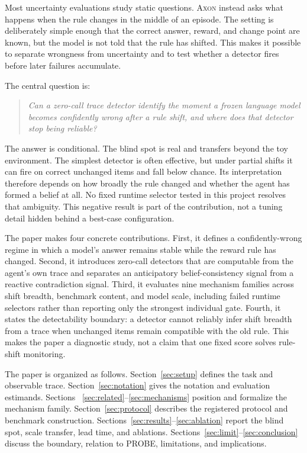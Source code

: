 \documentclass[pdflatex,sn-basic]{sn-jnl}
\theoremstyle{definition}
\newcommand{\axon}{\textsc{Axon}}
\begin{document}
Most uncertainty evaluations study static questions. \axon{} instead asks what happens when
the rule changes in the middle of an episode. The setting is deliberately simple enough that
the correct answer, reward, and change point are known, but the model is not told that the rule
has shifted. This makes it possible to separate wrongness from uncertainty and to test whether
a detector fires before later failures accumulate.

The central question is:
\begin{quote}
\emph{Can a zero-call trace detector identify the moment a frozen language model becomes
confidently wrong after a rule shift, and where does that detector stop being reliable?}
\end{quote}

The answer is conditional. The blind spot is real and transfers beyond the toy environment.
The simplest detector is often effective, but under partial shifts it can fire on correct
unchanged items and fall below chance. Its interpretation therefore depends on how broadly
the rule changed and whether the agent has formed a belief at all. No fixed runtime selector
tested in this project resolves that ambiguity. This negative result is part of the
contribution, not a tuning detail hidden behind a best-case configuration.

The paper makes four concrete contributions. First, it defines a confidently-wrong regime in
which a model's answer remains stable while the reward rule has changed. Second, it introduces
zero-call detectors that are computable from the agent's own trace and separates an anticipatory
belief-consistency signal from a reactive contradiction signal. Third, it evaluates nine
mechanism families across shift breadth, benchmark content, and model scale, including failed
runtime selectors rather than reporting only the strongest individual gate. Fourth, it states
the detectability boundary: a detector cannot reliably infer shift breadth from a trace when
unchanged items remain compatible with the old rule. This makes the paper a diagnostic study,
not a claim that one fixed score solves rule-shift monitoring.

The paper is organized as follows. Section~\ref{sec:setup} defines the task and observable
trace. Section~\ref{sec:notation} gives the notation and evaluation estimands. Sections
~\ref{sec:related}--\ref{sec:mechanisms} position and formalize the mechanism family.
Section~\ref{sec:protocol} describes the registered protocol and benchmark construction.
Sections~\ref{sec:results}--\ref{sec:ablation} report the blind spot, scale transfer, lead
time, and ablations. Sections~\ref{sec:limit}--\ref{sec:conclusion} discuss the boundary,
relation to PROBE, limitations, and implications.
\end{document}
